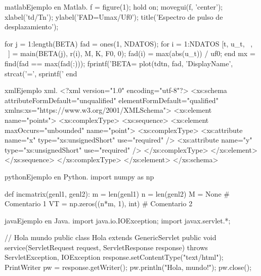 \begin{sourcecode}[\label{codigo-matlab}]{matlab}{Ejemplo en Matlab.}
f = figure(1);
hold on;
movegui(f, 'center');
xlabel('td/Tn'); ylabel('FAD=Umax/Uf0');
title('Espectro de pulso de desplazamiento');

for j = 1:length(BETA)
	fad = ones(1, NDATOS); %
	for i = 1:NDATOS
		[t, u_t, ~, ~] = main(BETA(j), r(i), M, K, F0, 0);
		fad(i) = max(abs(u_t)) / uf0;
	end
mx = find(fad == max(fad(:)));
fprintf('BETA=%
plot(tdtn, fad, 'DisplayName', strcat('\beta=', sprintf('%
end	
\end{sourcecode}

\begin{sourcecode}[]{xml}{Ejemplo xml.}
<?xml version="1.0" encoding="utf-8"?>
<xs:schema attributeFormDefault="unqualified" elementFormDefault="qualified"
xmlns:xs="https://www.w3.org/2001/XMLSchema">
	<xs:element name="points">
		<xs:complexType>
			<xs:sequence>
				<xs:element maxOccurs="unbounded" name="point">
					<xs:complexType>
						<xs:attribute name="x" type="xs:unsignedShort" use="required" />
						<xs:attribute name="y" type="xs:unsignedShort" use="required" />
					</xs:complexType>
				</xs:element>
			</xs:sequence>
		</xs:complexType>
	</xs:element>
</xs:schema>
\end{sourcecode}

\begin{sourcecode}[\label{codigo-python}]{python}{Ejemplo en Python.}
import numpy as np

def incmatrix(genl1, genl2):
m = len(genl1)
n = len(genl2)
M = None # Comentario 1
VT = np.zeros((n*m, 1), int) # Comentario 2
\end{sourcecode}

\begin{sourcecode}[\label{codigo-java}]{java}{Ejemplo en Java.}
import java.io.IOException; 
import javax.servlet.*;

// Hola mundo
public class Hola extends GenericServlet {
	public void service(ServletRequest request, ServletResponse response)
	throws ServletException, IOException{
		response.setContentType("text/html");
		PrintWriter pw = response.getWriter();
		pw.println("Hola, mundo!");
		pw.close();
	}
}
\end{sourcecode}


